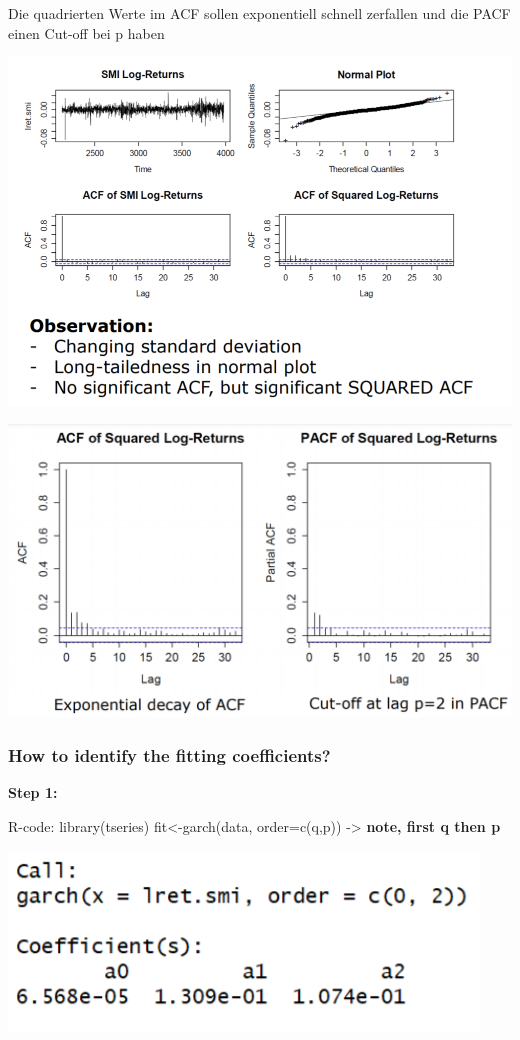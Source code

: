 \documentclass[
]{article}
\begin{document}
Die quadrierten Werte im ACF sollen exponentiell schnell zerfallen und
die PACF einen Cut-off bei p haben

\includegraphics[width=1\linewidth]{garch}

\includegraphics[width=1\linewidth]{square}

\hypertarget{how-to-identify-the-fitting-coefficients}{%
\subsubsection{How to identify the fitting
coefficients?}\label{how-to-identify-the-fitting-coefficients}}

\textbf{Step 1:}

R-code: library(tseries) fit\textless-garch(data, order=c(q,p))
-\textgreater{} \textbf{note, first q then p}

\includegraphics[width=0.5\linewidth]{arch1}
\end{document}
